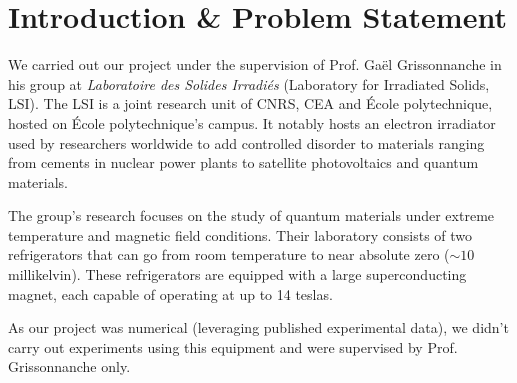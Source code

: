 \section{Introduction \& Problem Statement}

We carried out our project under the supervision of Prof. Gaël Grissonnanche in his group at \textit{Laboratoire des Solides Irradiés} (Laboratory for Irradiated Solids, LSI). 
The LSI is a joint research unit of CNRS, CEA and École polytechnique, hosted on École polytechnique's campus.
It notably hosts an electron irradiator used by researchers worldwide to add controlled disorder to materials ranging from cements in nuclear power plants to satellite photovoltaics and quantum materials.

The group's research focuses on the study of quantum materials under extreme temperature and magnetic field conditions. 
Their laboratory consists of two refrigerators that can go from room temperature to near absolute zero ($\sim 10$ millikelvin).
These refrigerators are equipped with a large superconducting magnet, 
each capable of operating at up to 14 teslas.

As our project was numerical (leveraging published experimental data),  
we didn't carry out experiments using this equipment and were supervised by Prof. Grissonnanche only. 

